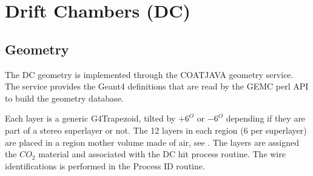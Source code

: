 \section{Drift Chambers (DC)}

\subsection{Geometry}

The DC geometry is implemented through the COATJAVA geometry service.
The service provides the Geant4 definitions that are read by the GEMC perl API to build the geometry database.

Each layer is a generic G4Trapezoid, tilted by $+6^O$ or $-6^O$ depending if they are part of a stereo superlayer or not.
The 12 layers in each region (6 per superlayer) are placed in a region mother volume made of air, see .
The layers are assigned the $CO_2$ material and associated with the DC hit process routine.
The wire identifications is performed in the Process ID routine.

